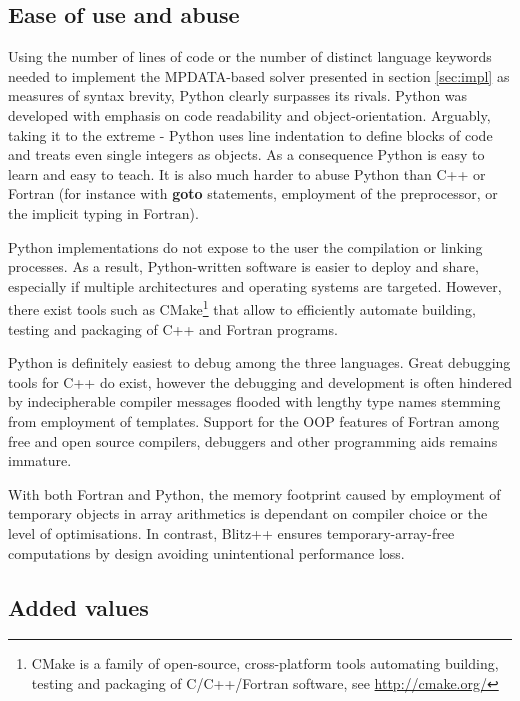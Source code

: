 \documentclass[gmd]{copernicus}%
\newcommand{\prog}[1]{{\rm\bf#1}}
\begin{document}
  \subsection{Ease of use and abuse}

  Using the number of lines of code or the number of distinct language keywords
    needed to implement the MPDATA-based
    solver presented in section \ref{sec:impl} as measures of syntax 
    brevity, Python clearly surpasses its rivals.
  Python was developed with emphasis on code readability and object-orientation.
  Arguably, taking it to the extreme - Python uses line indentation to define 
    blocks of code and treats even single integers as objects.
  As a consequence Python is easy to learn and easy to teach.
  It is also much harder to abuse Python than C++ or Fortran
    (for instance with \prog{goto} statements, employment of the preprocessor,
    or the implicit typing in Fortran).

  Python implementations do not expose to the user the compilation or linking processes. 
  As a result, Python-written software is easier to deploy and share, especially 
    if multiple architectures and operating systems are targeted.
  However, there exist tools such as CMake\footnote{CMake is a family of open-source, cross-platform
    tools automating building, testing and packaging of C/C++/Fortran software,
    see \url{http://cmake.org/}}
    that allow to efficiently automate 
    building, testing and packaging of C++ and Fortran programs.

  Python is definitely easiest to debug among the three languages.
  Great debugging tools for C++ do exist, however the debugging and development is 
    often hindered by indecipherable compiler messages
    flooded with lengthy type names stemming from employment of templates.
  Support for the OOP features of Fortran among free and open source compilers, 
    debuggers and other programming aids remains immature.
    
  With both Fortran and Python, the memory footprint caused by employment
    of temporary objects in array arithmetics is dependant on compiler choice or
    the level of optimisations.
  In contrast, Blitz++ ensures temporary-array-free computations by design
    \citep{Veldhuizen_et_al_1997} avoiding unintentional performance loss.

  \subsection{Added values}
\end{document}
